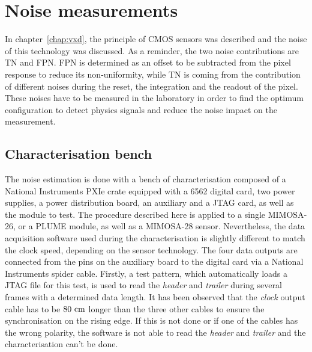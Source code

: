 \section{Noise measurements}
\label{sec:noiseMeasurements}

  In chapter~\ref{chap:vxd}, the principle of \gls{CMOS} sensors was described and the noise of this technology was discussed.
  As a reminder, the two noise contributions are \acrfull{TN} and \acrfull{FPN}.
  \gls{FPN} is determined as an offset to be subtracted from the pixel response to reduce its non-uniformity, while \gls{TN} is coming from the contribution of different noises during the reset, the integration and the readout of the pixel.
  These noises have to be measured in the laboratory in order to find the optimum configuration to detect physics signals and reduce the noise impact on the measurement.

  \subsection{Characterisation bench}

  The noise estimation is done with a bench of characterisation composed of a National Instruments PXIe crate equipped with a 6562 digital card, two power supplies, a power distribution board, an auxiliary and a \gls{JTAG} card, as well as the module to test.
  The procedure described here is applied to a single \gls{MIMOSA}-26, or a \gls{PLUME} module, as well as a \gls{MIMOSA}-28 sensor.
  Nevertheless, the data acquisition software used during the characterisation is slightly different to match the clock speed, depending on the sensor technology.
  The four data outputs are connected from the pins on the auxiliary board to the digital card via a National Instruments spider cable.
  Firstly, a test pattern, which automatically loads a \gls{JTAG} file for this test, is used to read the \textit{header} and \textit{trailer} during several frames with a determined data length.
  It has been observed that the \textit{clock} output cable has to be $80~\rm{cm}$ longer than the three other cables to ensure the synchronisation on the rising edge.
  If this is not done or if one of the cables has the wrong polarity, the software is not able to read the \textit{header} and \textit{trailer} and the characterisation can't be done.

